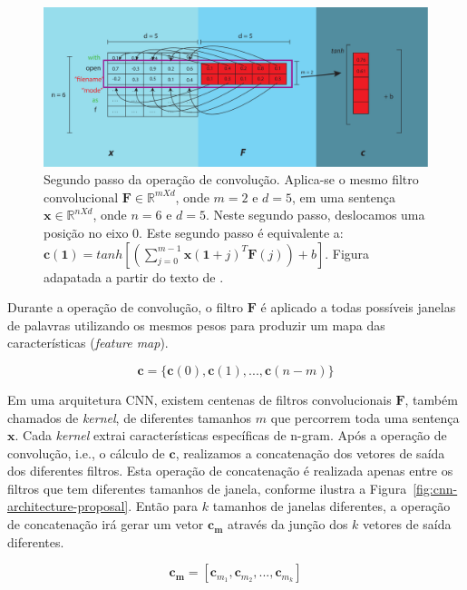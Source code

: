\begin{figure}[h]
    \centering
    \includegraphics[width=1\textwidth]{figuras/cap-problema/second-step-convolution.pdf}
    \caption{Segundo passo da operação de convolução. Aplica-se o mesmo filtro convolucional $\bm{F} \in \mathbb{R}^{m X d}$, onde $m = 2$ e $d = 5$, em uma sentença $\bm{x} \in \mathbb{R}^{n X d}$, onde $n = 6$ e $d = 5$. Neste segundo passo, deslocamos uma posição no eixo $0$. Este segundo passo é equivalente a: $\bm{c}(\bm{1}) = tanh [(\sum_{j=0}^{m - 1} \bm{x}(\bm{1} + j)^{T}\bm{F}(j)) + b]$. Figura adapatada a partir do texto de \cite{joshua-kim-cnn-understanding-word-embeddings-2019}.}
    \label{fig:second-step-convolutional}
\end{figure}


Durante a operação de convolução, o filtro $\bm{F}$ é aplicado a todas possíveis janelas de palavras utilizando os mesmos pesos para produzir um mapa das características (\textit{feature map}).

\begin{equation}
    \bm{c} = \{ \bm{c}(0), \bm{c}(1), . . ., \bm{c}(n - m) \} 
\end{equation}




Em uma arquitetura CNN, existem centenas de filtros convolucionais $\bm{F}$, também chamados de \textit{kernel}, de diferentes tamanhos $m$ que percorrem toda uma sentença $\bm{x}$. Cada \textit{kernel} extrai características específicas de n-gram. Após a operação de convolução, i.e., o cálculo de $\bm{c}$, realizamos a concatenação dos vetores de saída dos diferentes filtros.
Esta operação de concatenação é realizada apenas entre os filtros que tem diferentes tamanhos de janela, conforme ilustra a Figura~\ref{fig:cnn-architecture-proposal}.
Então para $k$ tamanhos de janelas diferentes, a operação de concatenação irá gerar um vetor $\bm{c}_{\bm{m}}$ através da junção dos $k$ vetores de saída diferentes.

\begin{equation}\label{eq:concatenacao-cnn-cm}
    \bm{c}_{\bm{m}} = \left[\bm{c}_{m_1}, \bm{c}_{m_2}, . . ., \bm{c}_{m_{k}}\right]
\end{equation}

